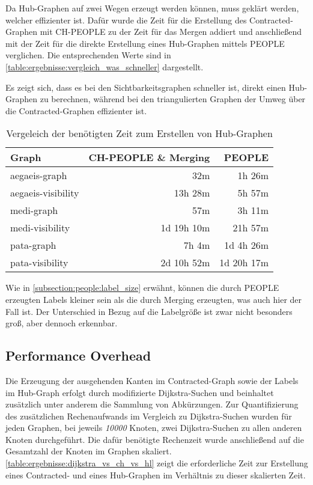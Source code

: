 Da Hub-Graphen auf zwei Wegen erzeugt werden können, muss geklärt werden, welcher effizienter ist.
Dafür wurde die Zeit für die Erstellung des Contracted-Graphen mit CH-PEOPLE zu der Zeit für das Mergen addiert und anschließend mit der Zeit für die direkte Erstellung eines Hub-Graphen mittels PEOPLE verglichen.
Die entsprechenden Werte sind in \autoref{table:ergebnisse:vergleich_was_schneller} dargestellt.

Es zeigt sich, dass es bei den Sichtbarkeitsgraphen schneller ist, direkt einen Hub-Graphen zu berechnen, während bei den triangulierten Graphen der Umweg über die Contracted-Graphen effizienter ist.

\begin{table}[h!]
  \centering
  \begin{tabular}{ %
      l %
      r
      r
    }
    \toprule
    {Graph}            & {CH-PEOPLE \& Merging} & {PEOPLE}             \\
    \midrule
    aegaeis-graph      & \B 32m                 & 1h 26m               \\
    aegaeis-visibility & 13h 28m                & \B 5h 57m            \\
    medi-graph         & \B 57m                 & 3h 11m               \\
    medi-visibility    & 1d 19h 10m             & \B 21h 57m           \\
    pata-graph         & \B 7h \phantom{0}4m    & 1d \phantom{0}4h 26m \\
    pata-visibility    & 2d 10h 52m             & \B 1d 20h 17m        \\  \bottomrule
  \end{tabular}
  \caption{Vergeleich der benötigten Zeit zum Erstellen von Hub-Graphen}
  \label{table:ergebnisse:vergleich_was_schneller}
\end{table}

Wie in \autoref{subsection:people:label_size} erwähnt, können die durch PEOPLE erzeugten Labels kleiner sein als die durch Merging erzeugten, was auch hier der Fall ist.
Der Unterschied in Bezug auf die Labelgröße ist zwar nicht besonders groß, aber dennoch erkennbar.

\subsection{Performance Overhead}

Die Erzeugung der ausgehenden Kanten im Contracted-Graph sowie der Labels im Hub-Graph erfolgt durch modifizierte Dijkstra-Suchen und beinhaltet zusätzlich unter anderem die Sammlung von Abkürzungen.
Zur Quantifizierung des zusätzlichen Rechenaufwands im Vergleich zu Dijkstra-Suchen wurden für jeden Graphen, bei jeweils \emph{10000} Knoten, zwei Dijkstra-Suchen zu allen anderen Knoten durchgeführt.
Die dafür benötigte Rechenzeit wurde anschließend auf die Gesamtzahl der Knoten im Graphen skaliert.
\autoref{table:ergebnisse:dijkstra_vs_ch_vs_hl} zeigt die erforderliche Zeit zur Erstellung eines Contracted- und eines Hub-Graphen im Verhältnis zu dieser skalierten Zeit.

